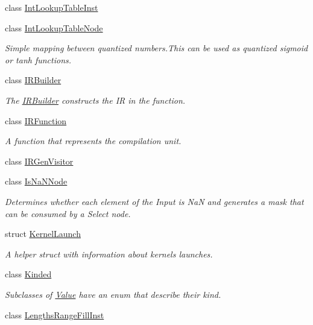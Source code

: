 \begin{DoxyCompactItemize}
class \hyperlink{classglow_1_1_int_lookup_table_inst}{Int\+Lookup\+Table\+Inst}
\item 
class \hyperlink{classglow_1_1_int_lookup_table_node}{Int\+Lookup\+Table\+Node}
\begin{DoxyCompactList}\small\item\em Simple mapping between quantized numbers.\+This can be used as quantized sigmoid or tanh functions. \end{DoxyCompactList}\item 
class \hyperlink{classglow_1_1_i_r_builder}{I\+R\+Builder}
\begin{DoxyCompactList}\small\item\em The \hyperlink{classglow_1_1_i_r_builder}{I\+R\+Builder} constructs the IR in the function. \end{DoxyCompactList}\item 
class \hyperlink{classglow_1_1_i_r_function}{I\+R\+Function}
\begin{DoxyCompactList}\small\item\em A function that represents the compilation unit. \end{DoxyCompactList}\item 
class \hyperlink{classglow_1_1_i_r_gen_visitor}{I\+R\+Gen\+Visitor}
\item 
class \hyperlink{classglow_1_1_is_na_n_node}{Is\+Na\+N\+Node}
\begin{DoxyCompactList}\small\item\em Determines whether each element of the Input is NaN and generates a mask that can be consumed by a Select node. \end{DoxyCompactList}\item 
struct \hyperlink{structglow_1_1_kernel_launch}{Kernel\+Launch}
\begin{DoxyCompactList}\small\item\em A helper struct with information about kernels launches. \end{DoxyCompactList}\item 
class \hyperlink{classglow_1_1_kinded}{Kinded}
\begin{DoxyCompactList}\small\item\em Subclasses of \hyperlink{classglow_1_1_value}{Value} have an enum that describe their kind. \end{DoxyCompactList}\item 
class \hyperlink{classglow_1_1_lengths_range_fill_inst}{Lengths\+Range\+Fill\+Inst}
\item 

\end{DoxyCompactItemize}
